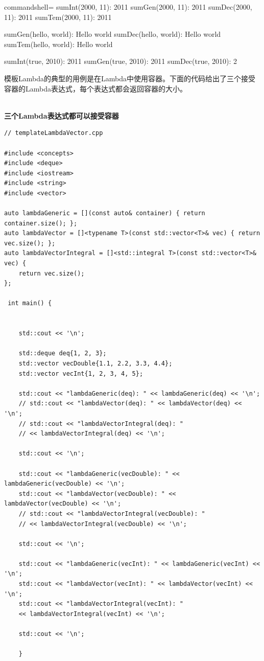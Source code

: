\begin{tcblisting}{commandshell={}}
sumInt(2000, 11): 2011
sumGen(2000, 11): 2011
sumDec(2000, 11): 2011
sumTem(2000, 11): 2011

sumGen(hello, world): Hello world
sumDec(hello, world): Hello world
sumTem(hello, world): Hello world

sumInt(true, 2010): 2011
sumGen(true, 2010): 2011
sumDec(true, 2010): 2
\end{tcblisting}

模板Lambda的典型的用例是在Lambda中使用容器。下面的代码给出了三个接受容器的Lambda表达式，每个表达式都会返回容器的大小。

\hspace*{\fill} \\ %
\noindent
\textbf{三个Lambda表达式都可以接受容器}
\begin{lstlisting}[style=styleCXX]
// templateLambdaVector.cpp

#include <concepts>
#include <deque>
#include <iostream>
#include <string>
#include <vector>

auto lambdaGeneric = [](const auto& container) { return container.size(); };
auto lambdaVector = []<typename T>(const std::vector<T>& vec) { return vec.size(); };
auto lambdaVectorIntegral = []<std::integral T>(const std::vector<T>& vec) {
	return vec.size();
};

 int main() {
	
	
	std::cout << '\n';
	
	std::deque deq{1, 2, 3};
	std::vector vecDouble{1.1, 2.2, 3.3, 4.4};
	std::vector vecInt{1, 2, 3, 4, 5};
	
	std::cout << "lambdaGeneric(deq): " << lambdaGeneric(deq) << '\n';
	// std::cout << "lambdaVector(deq): " << lambdaVector(deq) << '\n';
	// std::cout << "lambdaVectorIntegral(deq): "
	// << lambdaVectorIntegral(deq) << '\n';
	
	std::cout << '\n';
	
	std::cout << "lambdaGeneric(vecDouble): " << lambdaGeneric(vecDouble) << '\n';
	std::cout << "lambdaVector(vecDouble): " << lambdaVector(vecDouble) << '\n';
	// std::cout << "lambdaVectorIntegral(vecDouble): "
	// << lambdaVectorIntegral(vecDouble) << '\n';
	
	std::cout << '\n';
	
	std::cout << "lambdaGeneric(vecInt): " << lambdaGeneric(vecInt) << '\n';
	std::cout << "lambdaVector(vecInt): " << lambdaVector(vecInt) << '\n';
	std::cout << "lambdaVectorIntegral(vecInt): "
	<< lambdaVectorIntegral(vecInt) << '\n';
	
	std::cout << '\n';
	
	}
\end{lstlisting}

